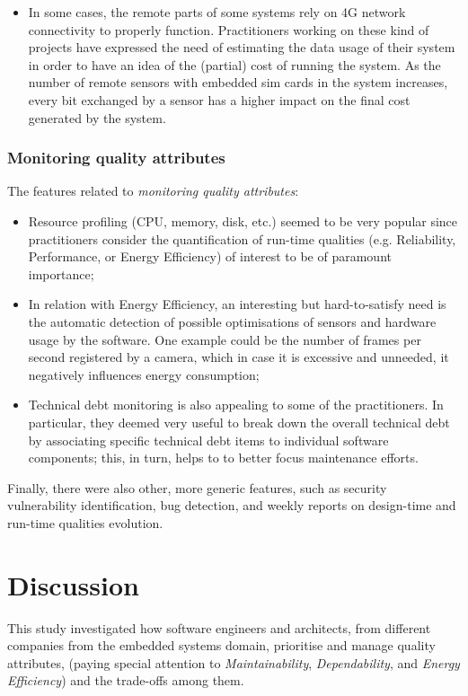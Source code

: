 \begin{itemize}
    \item In some cases, the remote parts of some systems rely on 4G network connectivity to properly function. Practitioners working on these kind of projects have expressed the need of estimating the data usage of their system in order to have an idea of the (partial) cost of running the system. As the number of remote sensors with embedded sim cards in the system increases, every bit exchanged by a sensor has a higher impact on the final cost generated by the system.
    
\end{itemize}

\subsubsection{Monitoring quality attributes}
The features related to \textit{monitoring quality attributes}:
\begin{itemize}
    \item Resource profiling (CPU, memory, disk, etc.) seemed to be very popular since practitioners consider the quantification of run-time qualities (e.g. Reliability, Performance, or Energy Efficiency) of interest to be of paramount importance;
    
    \item In relation with Energy Efficiency, an interesting but hard-to-satisfy need is the automatic detection of possible optimisations of sensors and hardware usage by the software.
    One example could be the number of frames per second registered by a camera, which in case it is excessive and unneeded, it negatively influences energy consumption;
    
    \item Technical debt monitoring is also appealing to some of the practitioners.
    In particular, they deemed very useful to break down the overall technical debt by associating specific technical debt items to individual software components; this, in turn, helps to to better focus maintenance efforts.
\end{itemize}

Finally, there were also other, more generic features, such as security vulnerability identification, bug detection, and weekly reports on design-time and run-time qualities evolution.

\section{Discussion}\label{c7:sec:discussion}
This study investigated how software engineers and architects, from different companies from the embedded systems domain, prioritise and manage quality attributes, (paying special attention to \textit{Maintainability}, \textit{Dependability}, and \textit{Energy Efficiency}) and the trade-offs among them.

